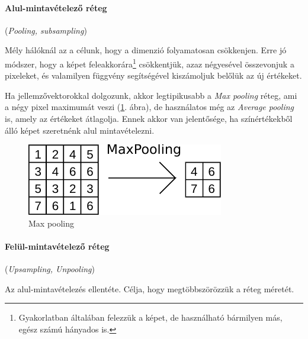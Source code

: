 \paragraph{Alul-mintavételező réteg} (\textit{Pooling, subsampling})



Mély hálóknál az a célunk, hogy a dimenzió folyamatosan csökkenjen. Erre jó módszer, hogy a képet feleakkorára\footnote{Gyakorlatban általában felezzük a képet, de használható bármilyen más, egész számú hányados is.} csökkentjük, azaz négyesével összevonjuk a pixeleket, és valamilyen függvény segítségével kiszámoljuk belőlük az új értékeket.



Ha jellemzővektorokkal dolgozunk, akkor legtipikusabb a \textit{Max pooling} réteg, ami a négy pixel maximumát veszi (\ref{fig:maxpooling-pelda}. ábra), de használatos még az \textit{Average pooling} is, amely az értékeket átlagolja. Ennek akkor van jelentősége, ha színértékekből álló képet szeretnénk alul mintavételezni.


\begin{figure} [h!]
	\centering
	\includegraphics[scale=1.2]{img/max-pooling-pelda.pdf}
	\caption{Max pooling}
	\label{fig:maxpooling-pelda}
\end{figure}


\paragraph{Felül-mintavételező réteg} (\textit{Upsampling, Unpooling})


Az alul-mintavételezés ellentéte. Célja, hogy megtöbbszörözzük a réteg
méretét.




